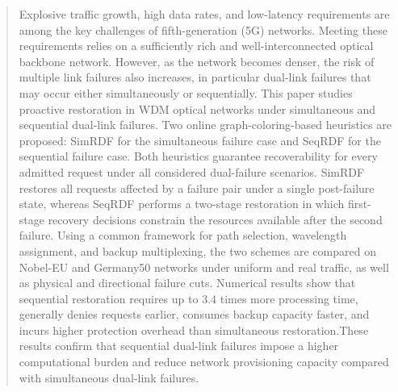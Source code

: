 \documentclass[conference]{IEEEtran}
\begin{document}
\begin{abstract}

Explosive traffic growth, high data rates, and low-latency requirements are among the key challenges of fifth-generation (5G) networks. Meeting these requirements relies on a sufficiently rich and well-interconnected optical backbone network. However, as the network becomes denser, the risk of multiple link failures also increases, in particular dual-link failures that may occur either simultaneously or sequentially.
This paper studies proactive restoration in WDM optical networks under simultaneous and sequential dual-link failures. Two online graph-coloring-based heuristics are proposed: SimRDF for the simultaneous failure case and SeqRDF for the sequential failure case. Both heuristics guarantee recoverability for every admitted request under all considered dual-failure scenarios. SimRDF restores all requests affected by a failure pair under a single post-failure state, whereas SeqRDF performs a two-stage restoration in which first-stage recovery decisions constrain the resources available after the second failure. Using a common framework for path selection, wavelength assignment, and backup multiplexing, the two schemes are compared on Nobel-EU and Germany50 networks under uniform and real traffic, as well as physical and directional failure cuts. Numerical results show that sequential restoration requires up to 3.4 times more processing time, generally denies requests earlier, consumes backup capacity faster, and incurs higher protection overhead than simultaneous restoration.These results confirm that sequential dual-link failures impose a higher computational burden and reduce network provisioning capacity compared with simultaneous dual-link failures.


\end{abstract}
\end{document}

